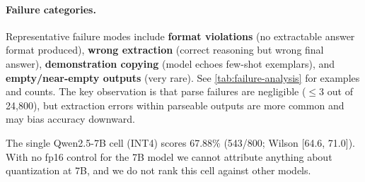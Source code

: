 \paragraph{Failure categories.} Representative failure modes include
\textbf{format violations} (no extractable answer format produced),
\textbf{wrong extraction} (correct reasoning but wrong final answer),
\textbf{demonstration copying} (model echoes few-shot exemplars), and
\textbf{empty/near-empty outputs} (very rare). See \cref{tab:failure-analysis}
for examples and counts. The key observation is that parse failures are
negligible ($\leq$3 out of 24,800), but extraction errors within parseable
outputs are more common and may bias accuracy downward.

The single Qwen2.5-7B cell (INT4) scores 67.88\% (543/800; Wilson
[64.6, 71.0]). With no fp16 control for the 7B model we cannot
attribute anything about quantization at 7B, and we do not rank this
cell against other models.
